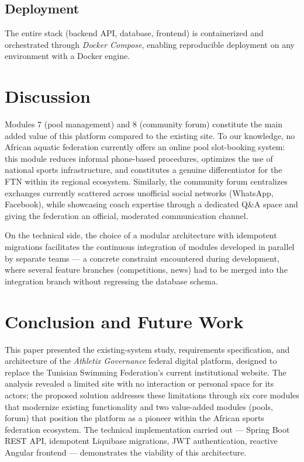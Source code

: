 \documentclass[conference]{IEEEtran}
\begin{document}
\subsection{Deployment}
The entire stack (backend API, database, frontend) is containerized and orchestrated through \emph{Docker Compose}, enabling reproducible deployment on any environment with a Docker engine.

\section{Discussion}
Modules 7 (pool management) and 8 (community forum) constitute the main added value of this platform compared to the existing site. To our knowledge, no African aquatic federation currently offers an online pool slot-booking system: this module reduces informal phone-based procedures, optimizes the use of national sports infrastructure, and constitutes a genuine differentiator for the FTN within its regional ecosystem. Similarly, the community forum centralizes exchanges currently scattered across unofficial social networks (WhatsApp, Facebook), while showcasing coach expertise through a dedicated Q\&A space and giving the federation an official, moderated communication channel.

On the technical side, the choice of a modular architecture with idempotent migrations facilitates the continuous integration of modules developed in parallel by separate teams — a concrete constraint encountered during development, where several feature branches (competitions, news) had to be merged into the integration branch without regressing the database schema.

\section{Conclusion and Future Work}
This paper presented the existing-system study, requirements specification, and architecture of the \emph{Athletix Governance} federal digital platform, designed to replace the Tunisian Swimming Federation's current institutional website. The analysis revealed a limited site with no interaction or personal space for its actors; the proposed solution addresses these limitations through six core modules that modernize existing functionality and two value-added modules (pools, forum) that position the platform as a pioneer within the African sports federation ecosystem. The technical implementation carried out — Spring Boot REST API, idempotent Liquibase migrations, JWT authentication, reactive Angular frontend — demonstrates the viability of this architecture.
\end{document}
